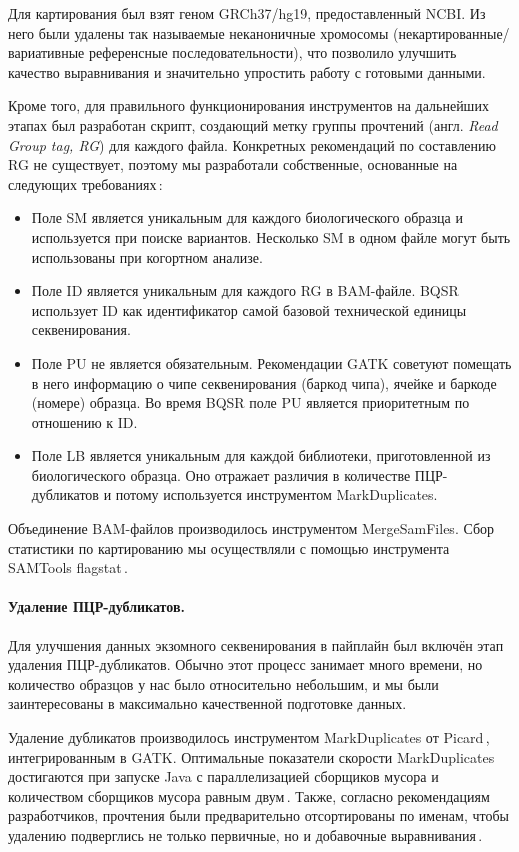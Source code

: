 \documentclass[a4paper,14pt]{extarticle}
\newcommand{\utilname}[1]{\textenglish{#1}}
\newcommand{\engterm}[1]{англ. \textenglish{\textit{#1}}}
\begin{document}
Для картирования был взят геном GRCh37/hg19, предоставленный NCBI.
Из него были удалены так называемые неканоничные хромосомы (некартированные/вариативные референсные последовательности), что позволило улучшить качество выравнивания и значительно упростить работу с готовыми данными.

Кроме того, для правильного функционирования инструментов на дальнейших этапах был разработан скрипт, создающий метку группы прочтений (\engterm{Read Group tag, RG}) для каждого файла.
Конкретных рекомендаций по составлению RG не существует, поэтому мы разработали собственные, основанные на следующих требованиях\,\citep{Auwera_2013}:

\begin{itemize}
	\item Поле SM является уникальным для каждого биологического образца и используется при поиске вариантов.
	      Несколько SM в одном файле могут быть использованы при когортном анализе.
	\item Поле ID является уникальным для каждого RG в BAM-файле.
	      BQSR использует ID как идентификатор самой базовой технической единицы секвенирования.
	\item Поле PU не является обязательным.
	      Рекомендации GATK советуют помещать в него информацию о чипе секвенирования (баркод чипа), ячейке и баркоде (номере) образца.
	      Во время BQSR поле PU является приоритетным по отношению к ID.
	\item Поле LB является уникальным для каждой библиотеки, приготовленной из биологического образца.
	      Оно отражает различия в количестве ПЦР\hyp{}дубликатов и потому используется инструментом \utilname{MarkDuplicates}.
\end{itemize}

Объединение BAM-файлов производилось инструментом \utilname{MergeSamFiles}.
Сбор статистики по картированию мы осуществляли с помощью инструмента \utilname{SAMTools flagstat}\,\citep{Li_2009_SAMTools}.

\paragraph{Удаление ПЦР\hyp{}дубликатов.}
Для улучшения данных экзомного секвенирования в пайплайн был включён этап удаления ПЦР\hyp{}дубликатов.
Обычно этот процесс занимает много времени, но количество образцов у нас было относительно небольшим, и мы были заинтересованы в максимально качественной подготовке данных.

Удаление дубликатов производилось инструментом \utilname{MarkDuplicates} от Picard\,\citep{PicardTools}, интегрированным в \utilname{GATK}.
Оптимальные показатели скорости \utilname{MarkDuplicates} достигаются при запуске \utilname{Java} с параллелизацией сборщиков мусора и количеством сборщиков мусора равным двум\,\citep{Heldenbrand_2019}.
Также, согласно рекомендациям разработчиков, прочтения были предварительно отсортированы по именам, чтобы удалению подверглись не только первичные, но и добавочные выравнивания\,\citep{Auwera_2013}.
\end{document}

